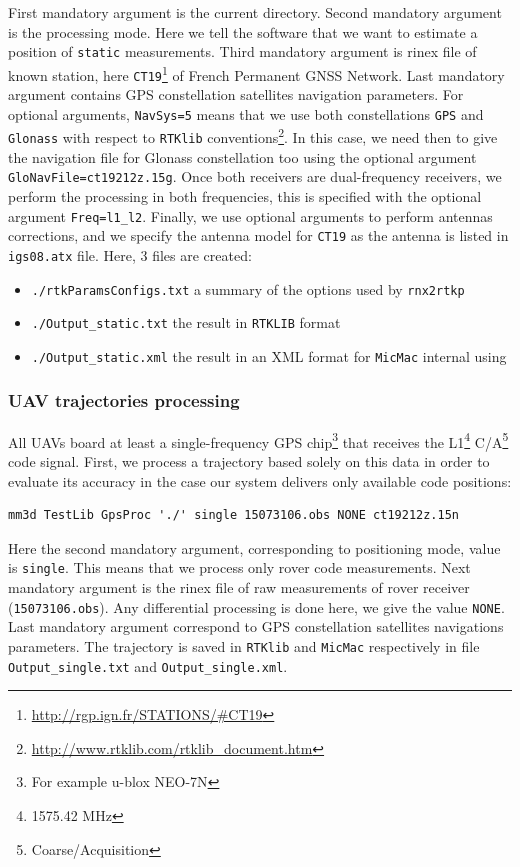 First mandatory argument is the current directory. Second mandatory argument is the processing mode. Here we tell the software that we want to estimate a position of {\tt static} measurements. Third mandatory argument is rinex file of known station, here {\tt CT19}\footnote{\url{http://rgp.ign.fr/STATIONS/\#CT19}} of French Permanent GNSS Network. Last mandatory argument contains GPS constellation satellites navigation parameters. For optional arguments, {\tt NavSys=5} means that we use both constellations {\tt GPS} and {\tt Glonass} with respect to {\tt RTKlib} conventions\footnote{\url{http://www.rtklib.com/rtklib_document.htm}}. In this case, we need then to give the navigation file for Glonass constellation too using the optional argument {\tt GloNavFile=ct19212z.15g}. Once both receivers are dual-frequency receivers, we perform the processing in both frequencies, this is specified with the optional argument {\tt Freq=l1\_l2}. Finally, we use optional arguments to perform antennas corrections, and we specify the antenna model for {\tt CT19} as the antenna is listed in {\tt igs08.atx} file. Here, 3 files are created:\newline
\begin{itemize}
\item {\tt ./rtkParamsConfigs.txt} a summary of the options used by {\tt rnx2rtkp}
\item {\tt ./Output\_static.txt} the result in {\tt RTKLIB} format
\item {\tt ./Output\_static.xml} the result in an XML format for {\tt MicMac} internal using
\end{itemize}

\subsubsection{UAV trajectories processing}
All UAVs board at least a single-frequency GPS chip\footnote{For example u-blox NEO-7N} that receives the L1\footnote{1575.42 MHz} C/A\footnote{Coarse/Acquisition} code signal. First, we process a trajectory based solely on this data in order to evaluate its accuracy in the case our system delivers only available code positions:

\begin{verbatim}
mm3d TestLib GpsProc './' single 15073106.obs NONE ct19212z.15n
\end{verbatim}

Here the second mandatory argument, corresponding to positioning mode, value is {\tt single}. This means that we process only rover code measurements. Next mandatory argument is the rinex file of raw measurements of rover receiver ({\tt 15073106.obs}). Any differential processing is done here, we give the value {\tt NONE}. Last mandatory argument correspond to GPS constellation satellites navigations parameters. The trajectory is saved in {\tt RTKlib} and {\tt MicMac} respectively in file {\tt Output\_single.txt} and {\tt Output\_single.xml}.\newline

